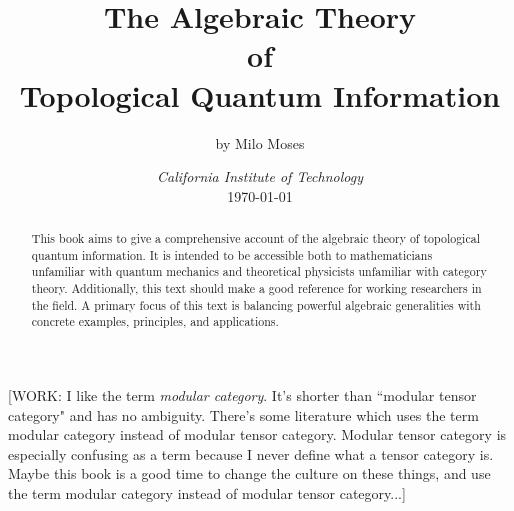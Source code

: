 \documentclass{article}
\title{The Algebraic Theory\\ of \\ Topological Quantum Information}
\author{by Milo Moses}
\date{\textit{California Institute of Technology} \\ [2ex] \today}
\theoremstyle{definition}
\newcommand{\0}{\left|0\right>}
\newcommand{\1}{\left|1\right>}
\numberwithin{figure}{section}
\begin{document}
\maketitle


\begin{abstract}
This book aims to give a comprehensive account of the algebraic theory of topological quantum information. It is intended to be accessible both to mathematicians unfamiliar with quantum mechanics and theoretical physicists unfamiliar with category theory. Additionally, this text should make a good reference for working researchers in the field. A primary focus of this text is balancing powerful algebraic generalities with concrete examples, principles, and applications.
\end{abstract}


\newpage

\tableofcontents

\newpage


















\appendix






[WORK: I like the term \textit{modular category}. It's shorter than ``modular tensor category" and has no ambiguity. There's some literature which uses the term modular category instead of modular tensor category. Modular tensor category is especially confusing as a term because I never define what a tensor category is. Maybe this book is a good time to change the culture on these things, and use the term modular category instead of modular tensor category...]




\end{document}
